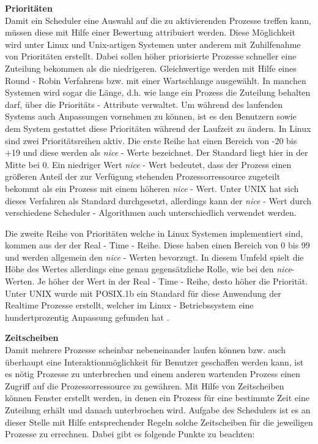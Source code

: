 \textbf{Prioritäten}\\
Damit ein Scheduler eine Auswahl auf die zu aktivierenden Prozesse treffen kann, müssen diese mit Hilfe einer Bewertung attribuiert werden. Diese Möglichkeit wird unter Linux und Unix-artigen Systemen unter anderem mit Zuhilfenahme von Prioritäten erstellt.
Dabei sollen höher priorisierte Prozesse schneller eine Zuteilung bekommen als die niedrigeren. Gleichwertige werden mit Hilfe eines Round - Robin Verfahrens bzw. mit einer Wartschlange ausgewählt. In manchen Systemen wird sogar die Länge, d.h. wie lange ein Prozess die Zuteilung behalten darf, über die Prioritäts - Attribute verwaltet. Um während des laufenden Systems auch Anpassungen vornehmen zu kön\-nen, ist es den Benutzern sowie dem System gestattet diese Prioritäten während der Laufzeit zu ändern.
In Linux sind zwei Prioritäts\-reihen aktiv. Die erste Reihe hat einen Bereich von -20 bis +19 und diese werden als \textit{nice} - Werte bezeichnet. Der Standard liegt hier in der Mitte bei 0. Ein niedriger Wert \textit{nice} - Wert bedeutet, dass der Prozess einen größeren Anteil der zur Verfügung stehenden Prozessorressource zugeteilt bekommt als ein Prozess mit einem höheren \textit{nice} - Wert.
Unter UNIX hat sich dieses Verfahren als Standard durchgesetzt, allerdings kann der \textit{nice} - Wert durch verschiedene Scheduler - Algorithmen auch unterschiedlich verwendet werden.

Die zweite Reihe von Prioritäten welche in Linux Systemen implementiert sind, kommen aus der der Real - Time - Reihe. Diese haben einen Bereich von 0 bis 99 und werden allgemein den \textit{nice} - Werten bevorzugt. In diesem Umfeld spielt die Höhe des Wertes allerdings eine genau gegensätzliche Rolle,  wie bei den \textit{nice}-Werten. Je höher der Wert in der Real - Time - Reihe, desto höher die Priorität. Unter UNIX wurde mit POSIX.1b ein Standard für diese Anwendung der Realtime Prozesse erstellt, welcher im Linux - Betriebssystem eine hundertprozentig Anpassung gefunden hat \cite{rlove}.

\textbf{Zeitscheiben}\\
Damit mehrere Prozesse scheinbar nebeneinander laufen können bzw. auch überhaupt eine Interaktionmöglichkeit für Benutzer geschaffen werden kann, ist es nötig Prozesse zu unterbrechen und einem anderen wartenden Prozess einen Zugriff auf die Prozessor\-ressource zu gewähren. Mit Hilfe von Zeitscheiben können Fenster erstellt werden, in denen ein Prozess für eine bestimmte Zeit eine Zuteilung erhält und danach unterbrochen wird.
Aufgabe des Schedulers ist es an dieser Stelle mit Hilfe entsprechender Regeln solche Zeitscheiben für die jeweiligen Prozesse zu errechnen. Dabei gibt es folgende Punkte zu beachten:

